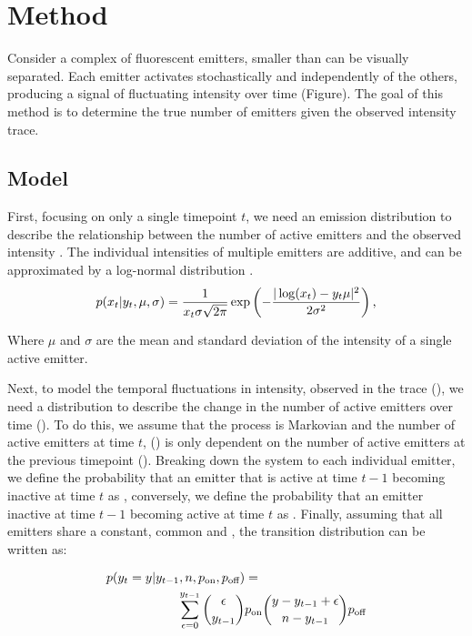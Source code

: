 \section{Method}

Consider a complex of fluorescent emitters, smaller than can be visually separated. Each emitter activates stochastically and independently of the others, producing a signal of fluctuating intensity over time (Figure).
The goal of this method is to determine the true number of emitters \truen given the observed intensity trace.

\subsection{Model}

First, focusing on only a single timepoint $t$, we need an emission distribution to describe the relationship between the number of active emitters  and the observed intensity . The individual intensities of multiple emitters are additive, and can be approximated by a log-normal distribution \cite{mutch_deconvolving_2007} \ie.
%
\begin{equation*}
  p(x_{t}|y_{t}, \mu, \sigma) =
    \frac{1}{x_{t}\sigma\sqrt{2\pi}}
    \exp \left(
      - \frac{|\log(x_{t}) - y_{t}\mu|^2}{2\sigma^2}
    \right)
  \text{,}
\end{equation*}

Where $\mu$ and $\sigma$ are the mean and standard deviation of the intensity of a single active emitter.

Next, to model the temporal fluctuations in intensity, observed in the trace (\trace), we need a distribution to describe the change in the number of active emitters over time (\states). To do this, we assume that the process is Markovian and the number of active emitters at time $t$, () is only dependent on the number of active emitters at the previous timepoint (). Breaking down the system to each individual emitter, we define the probability that an emitter that is active at time $t-1$ becoming inactive at time $t$ as \poff, conversely, we define the probability that an emitter inactive at time $t-1$ becoming active at time $t$ as \pon. Finally, assuming that all emitters share a constant, common \poff and \pon, the transition distribution can be written as:

\begin{align*}
  p(\y{t} = y | \y{t-1}, \n, \pon, \poff) &=\\
	\sum_{\epsilon = 0}^{\y{t-1}}
    {\epsilon \choose \y{t-1}}
    &\pon
    {y - \y{t-1} + \epsilon \choose \n - \y{t-1}}
    \poff
\end{align*}

